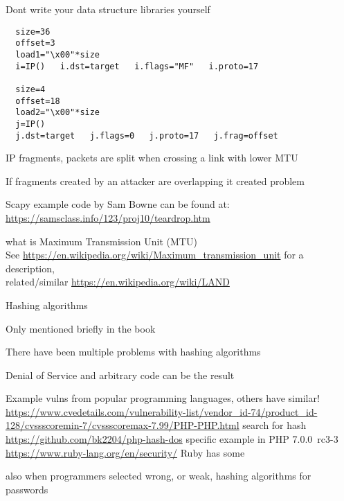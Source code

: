 \documentclass[Screen16to9,17pt]{foils}
\begin{document}
\vskip 1cm
\centerline{Dont write your data structure libraries yourself}


\begin{verbatim}
  size=36
  offset=3
  load1="\x00"*size
  i=IP()   i.dst=target   i.flags="MF"   i.proto=17

  size=4
  offset=18
  load2="\x00"*size
  j=IP()
  j.dst=target   j.flags=0   j.proto=17   j.frag=offset
\end{verbatim}

\begin{list2}
\item IP fragments, packets are split when crossing a link with lower MTU
\item If fragments created by an attacker are overlapping it created problem
\item Scapy example code by Sam Bowne can be found at:\\
\url{https://samsclass.info/123/proj10/teardrop.htm}
\item what is Maximum Transmission Unit (MTU)\\
See \url{https://en.wikipedia.org/wiki/Maximum_transmission_unit} for a description,\\ related/similar \url{https://en.wikipedia.org/wiki/LAND}
\end{list2}





\begin{list2}
\item Hashing algorithms
\item Only mentioned briefly in the book
\item There have been multiple problems with hashing algorithms
\item Denial of Service and arbitrary code can be the result
\item Example vulns from popular programming languages, others have similar!\\
\url{https://www.cvedetails.com/vulnerability-list/vendor_id-74/product_id-128/cvssscoremin-7/cvssscoremax-7.99/PHP-PHP.html} search for hash \\
\url{https://github.com/bk2204/php-hash-dos} specific example in PHP 7.0.0~rc3-3\\
\url{https://www.ruby-lang.org/en/security/} Ruby has some
\item also when programmers selected wrong, or weak, hashing algorithms for passwords
\end{list2}
\end{document}
